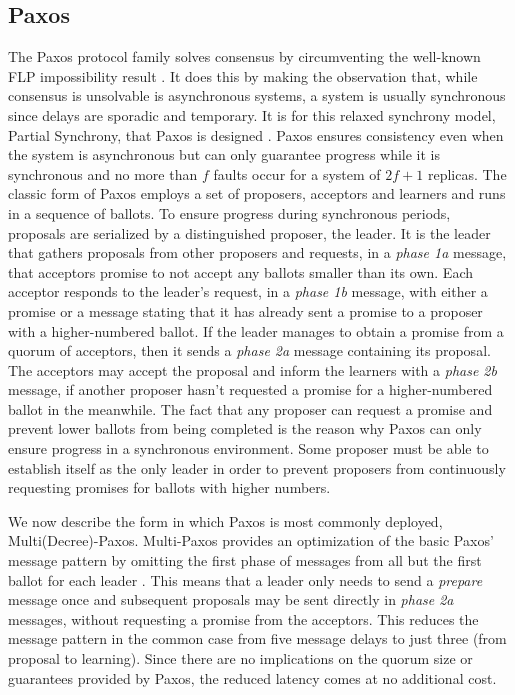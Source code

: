 \documentclass[runningheads,a4paper]{llncs}
\begin{document}
\subsection{Paxos} \label{Paxos}

The Paxos protocol family solves consensus by circumventing the well-known FLP impossibility result \cite{Fischer1985}. It does this by making the observation that, while consensus is unsolvable is asynchronous systems, a system is usually synchronous since delays are sporadic and temporary. It is for this relaxed synchrony model, Partial Synchrony, that Paxos is designed \cite{Lamport2001}. Paxos ensures consistency even when the system is asynchronous but can only guarantee progress while it is synchronous and no more than $f$ faults occur for a system of $2f+1$ replicas. The classic form of Paxos employs a set of proposers, acceptors and learners and runs in a sequence of ballots. To ensure progress during synchronous periods, proposals are serialized by a distinguished proposer, the leader. It is the leader that gathers proposals from other proposers and requests, in a \textit{phase 1a} message, that acceptors promise to not accept any ballots smaller than its own. Each acceptor responds to the leader's request, in a \textit{phase 1b} message, with either a promise or a message stating that it has already sent a promise to a proposer with a higher-numbered ballot. If the leader manages to obtain a promise from a quorum of acceptors, then it sends a \textit{phase 2a} message containing its proposal. The acceptors may accept the proposal and inform the learners with a \textit{phase 2b} message, if another proposer hasn't requested a promise for a higher-numbered ballot in the meanwhile. The fact that any proposer can request a promise and prevent lower ballots from being completed is the reason why Paxos can only ensure progress in a synchronous environment. Some proposer must be able to establish itself as the only leader in order to prevent proposers from continuously requesting promises for ballots with higher numbers. \par
We now describe the form in which Paxos is most commonly deployed, Multi(Decree)-Paxos. Multi-Paxos provides an optimization of the basic Paxos' message pattern by omitting the first phase of messages from all but the first ballot for each leader \cite{Renesse2011}. This means that a leader only needs to send a \textit{prepare} message once and subsequent proposals may be sent directly in \textit{phase 2a} messages, without requesting a promise from the acceptors. This reduces the message pattern in the common case from five message delays to just three (from proposal to learning). Since there are no implications on the quorum size or guarantees provided by Paxos, the reduced latency comes at no additional cost. \par
\end{document}
